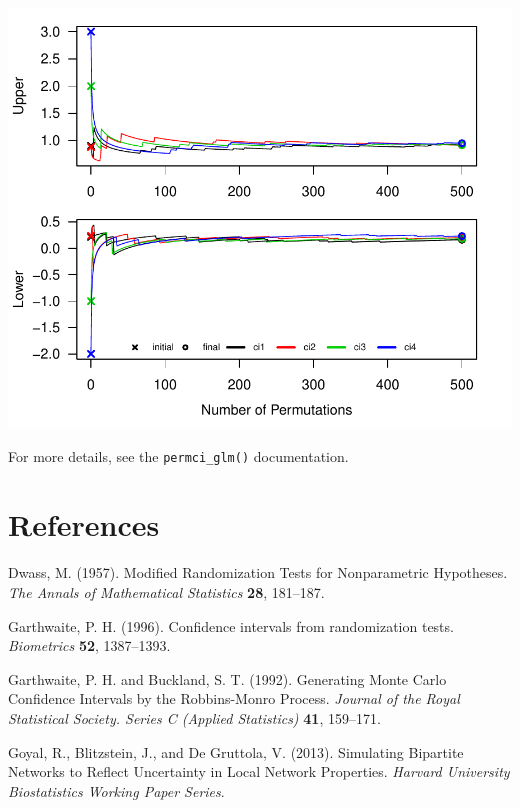 \documentclass[12pt]{article}\usepackage[]{graphicx}\usepackage[]{color}
\makeatletter
\def\maxwidth{ %
  \ifdim\Gin@nat@width>\linewidth
    \linewidth
  \else
    \Gin@nat@width
  \fi
}
\newenvironment{knitrout}{}{} %
\makeatother
\begin{document}
\begin{knitrout}
\color{fgcolor}

{\centering \includegraphics[width=\maxwidth]{figure/ci_plots3-1} 

}



\end{knitrout}
For more details, see the \texttt{permci\_glm()} documentation.


\section*{References}
\noindent\hangindent=15pt Dwass, M. (1957). Modified Randomization Tests for Nonparametric Hypotheses. \textit{The Annals of Mathematical Statistics} \textbf{28}, 181--187.

\noindent\hangindent=15pt Garthwaite, P. H. (1996). Confidence intervals from randomization tests. \textit{Biometrics} \textbf{52}, 1387--1393.

\noindent\hangindent=15pt Garthwaite, P. H. and Buckland, S. T. (1992). Generating Monte Carlo Confidence Intervals by the Robbins-Monro Process. \textit{Journal of the Royal Statistical Society. Series C (Applied Statistics)} \textbf{41}, 159--171.

\noindent\hangindent=15pt Goyal, R., Blitzstein, J., and De Gruttola, V. (2013). Simulating Bipartite Networks to Reflect Uncertainty in Local Network Properties. \textit{Harvard University Biostatistics Working Paper Series}.
\end{document}
